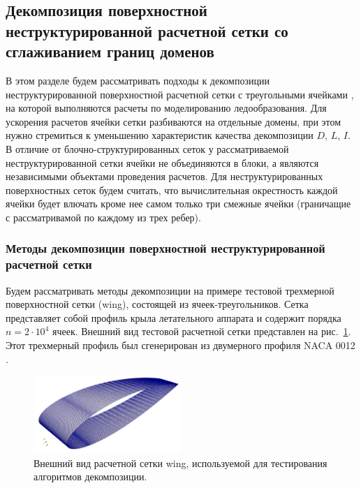 
\subsection{Декомпозиция поверхностной неструктурированной расчетной сетки со сглаживанием границ доменов}

В этом разделе будем рассматривать подходы к декомпозиции неструктурированной поверхностной расчетной сетки с треугольными ячейками \cite{Rybakov2020Decomp}, на которой выполняются расчеты по моделированию ледообразования.
Для ускорения расчетов ячейки сетки разбиваются на отдельные домены, при этом нужно стремиться к уменьшению характеристик качества декомпозиции $D$, $L$, $I$.
В отличие от блочно-структурированных сеток у рассматриваемой неструктурированной сетки ячейки не объединяются в блоки, а являются независимыми объектами проведения расчетов.
Для неструктурированных поверхностных сеток будем считать, что вычислительная окрестность каждой ячейки будет влючать кроме нее самом только три смежные ячейки (граничащие с рассматривамой по каждому из трех ребер).

\subsubsection{Методы декомпозиции поверхностной \mbox{неструктурированной} расчетной сетки}

Будем рассматривать методы декомпозиции на примере тестовой трехмерной поверхностной сетки (wing), состоящей из ячеек-треугольников.
Сетка представляет собой профиль крыла летательного аппарата и содержит порядка $n = 2 \cdot 10^4$ ячеек.
Внешний вид тестовой расчетной сетки представлен на рис.~\ref{fig:text_2_decompsurf_wing_grid}.
Этот трехмерный профиль был сгенерирован из двумерного профиля NACA 0012 \cite{Naca0012}.

\begin{figure}[ht]
\centering
\includegraphics[width=0.5\textwidth]{fig/par_wing_grid.png}
\singlespacing
{}\caption{Внешний вид расчетной сетки wing, используемой для тестирования алгоритмов декомпозиции.}
\label{fig:text_2_decompsurf_wing_grid}
\end{figure}

